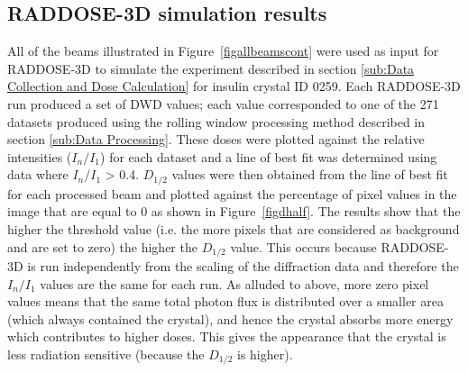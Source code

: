 \subsection{RADDOSE-3D simulation results}
All of the beams illustrated in Figure~\ref{figallbeamscont} were used as input for RADDOSE-3D to simulate the experiment described in section \ref{sub:Data Collection and Dose Calculation} for insulin crystal ID 0259.
Each RADDOSE-3D run produced a set of DWD values; each value corresponded to one of the 271 datasets produced using the rolling window processing method described in section \ref{sub:Data Processing}.
These doses were plotted against the relative intensities ($I_n / I_1$) for each dataset and a line of best fit was determined using data where $I_n / I_1$ > 0.4.
$D_{1/2}$ values were then obtained from the line of best fit for each processed beam and plotted against the percentage of pixel values in the image that are equal to 0 as shown in Figure~\ref{figdhalf}.
The results show that the higher the threshold value (i.e. the more pixels that are considered as background and are set to zero) the higher the $D_{1/2}$ value.
This occurs because RADDOSE-3D is run independently from the scaling of the diffraction data and therefore the $I_n/I_1$ values are the same for each run.
As alluded to above, more zero pixel values means that the same total photon flux is distributed over a smaller area (which always contained the crystal), and hence the crystal absorbs more energy which contributes to higher doses.
This gives the appearance that the crystal is less radiation sensitive (because the $D_{1/2}$ is higher).

